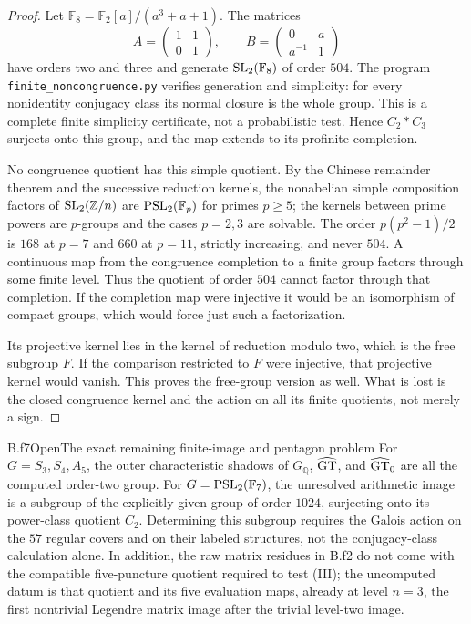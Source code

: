 \begin{proof}
Let $\mathbb F_8=\mathbb F_2[a]/(a^3+a+1)$. The matrices
\[
 A=\begin{pmatrix}1&1\\0&1\end{pmatrix},\qquad
 B=\begin{pmatrix}0&a\\a^{-1}&1\end{pmatrix}
\]
have orders two and three and generate $\operatorname{SL}_2(\mathbb F_8)$ of order
$504$. The program \nolinkurl{finite_noncongruence.py} verifies generation
and simplicity: for every nonidentity conjugacy class its normal
closure is the whole group. This is a complete finite simplicity
certificate, not a probabilistic test. Hence $C_2*C_3$ surjects onto
this group, and the map extends to its profinite completion.

No congruence quotient has this simple quotient. By the Chinese
remainder theorem and the successive reduction kernels, the
nonabelian simple composition factors of $\operatorname{SL}_2(\mathbb Z/n)$ are
$\operatorname{PSL}_2(\mathbb F_p)$ for primes $p\ge5$; the kernels between prime
powers are $p$-groups and the cases $p=2,3$ are solvable. The order
$p(p^2-1)/2$ is $168$ at $p=7$ and $660$ at $p=11$, strictly increasing,
and never $504$. A continuous map from the congruence completion to a
finite group factors through some finite level. Thus the quotient of
order $504$ cannot factor through that completion. If the completion
map were injective it would be an isomorphism of compact groups, which
would force just such a factorization.

Its projective kernel lies in the kernel of reduction modulo two,
which is the free subgroup $F$. If the comparison restricted to $F$
were injective, that projective kernel would vanish. This proves the
free-group version as well. What is lost is the closed congruence
kernel and the action on all its finite quotients, not merely a sign.
\end{proof}

\begin{claim}{B.f7}{Open}{The exact remaining finite-image and pentagon problem}
For $G=S_3,S_4,A_5$, the outer characteristic shadows of $G_\mathbb Q$,
$\widehat{\mathrm{GT}}$, and $\widehat{\mathrm{GT}}_0$ are all the computed order-two group. For
$G=\operatorname{PSL}_2(\mathbb F_7)$, the unresolved arithmetic image is a subgroup
of the explicitly given group of order $1024$, surjecting onto its
power-class quotient $C_2$. Determining this subgroup requires the
Galois action on the $57$ regular covers and on their labeled structures,
not the conjugacy-class calculation alone. In addition, the raw
matrix residues in B.f2 do not come with the compatible five-puncture
quotient required to test (III); the uncomputed datum is that quotient
and its five evaluation maps, already at level $n=3$, the first nontrivial Legendre matrix image
after the trivial level-two image.
\end{claim}

